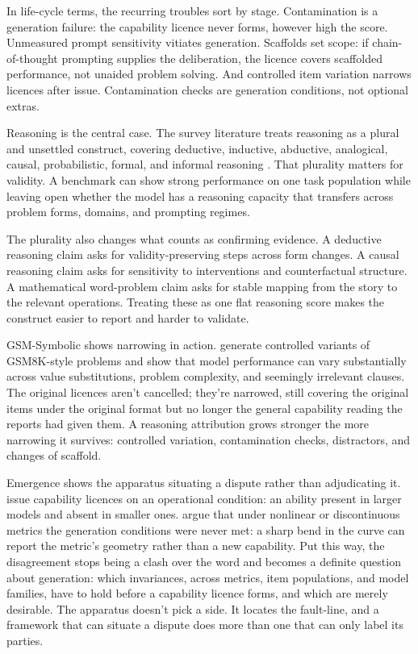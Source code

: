 \documentclass[12pt]{article}
\begin{document}
In life-cycle terms, the recurring troubles sort by stage. Contamination is a
generation failure: the capability licence never forms, however high the score.
Unmeasured prompt sensitivity vitiates generation. Scaffolds set scope: if
chain-of-thought prompting supplies the deliberation, the licence covers
scaffolded performance, not unaided problem solving. And controlled item
variation narrows licences after issue. Contamination checks are generation
conditions, not optional extras.

Reasoning is the central case. The survey literature treats reasoning as
a plural and unsettled construct, covering deductive, inductive, abductive,
analogical, causal, probabilistic, formal, and informal reasoning
\citep{huang2023reasoning}. That plurality matters for validity. A benchmark can
show strong performance on one task population while leaving open whether the
model has a reasoning capacity that transfers across problem forms, domains, and
prompting regimes.

The plurality also changes what counts as confirming evidence. A deductive
reasoning claim asks for validity-preserving steps across form changes. A causal
reasoning claim asks for sensitivity to interventions and counterfactual
structure. A mathematical word-problem claim asks for stable mapping from the
story to the relevant operations. Treating these as one flat reasoning score
makes the construct easier to report and harder to validate.

GSM-Symbolic shows narrowing in action. \textcite{mirzadeh2025gsm} generate
controlled variants of GSM8K-style problems and show that model performance can
vary substantially across value substitutions, problem complexity, and seemingly
irrelevant clauses. The original licences aren't cancelled; they're narrowed,
still covering the original items under the original format but no longer the
general capability reading the reports had given them. A reasoning attribution
grows stronger the more narrowing it survives: controlled variation,
contamination checks, distractors, and changes of scaffold.

Emergence shows the apparatus situating a dispute rather than adjudicating it.
\textcite{wei2022emergent} issue capability licences on an operational
condition: an ability present in larger models and absent in smaller ones.
\textcite{schaeffer2023emergent} argue that under nonlinear or discontinuous
metrics the generation conditions were never met: a sharp bend in the curve can
report the metric's geometry rather than a new capability. Put this way, the
disagreement stops being a clash over the word  and becomes
a definite question about generation: which invariances, across metrics, item
populations, and model families, have to hold before a capability licence
forms, and which are merely desirable. The apparatus doesn't pick a side. It locates
the fault-line, and a framework that can situate a dispute does more than one
that can only label its parties.
\end{document}
